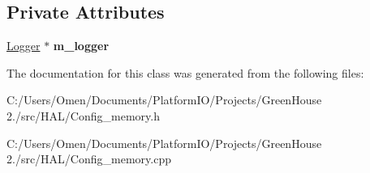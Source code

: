 \subsection*{Private Attributes}
\begin{DoxyCompactItemize}
\item 
\mbox{\label{class_h_a_l_1_1_config__memory_a884de2bfa5cf58adb8e25636eead14b9}} 
\hyperlink{class_logger}{Logger} $\ast$ {\bfseries m\+\_\+logger}
\end{DoxyCompactItemize}


The documentation for this class was generated from the following files\+:\begin{DoxyCompactItemize}
\item 
C\+:/\+Users/\+Omen/\+Documents/\+Platform\+I\+O/\+Projects/\+Green\+House 2./src/\+H\+A\+L/Config\+\_\+memory.\+h\item 
C\+:/\+Users/\+Omen/\+Documents/\+Platform\+I\+O/\+Projects/\+Green\+House 2./src/\+H\+A\+L/Config\+\_\+memory.\+cpp\end{DoxyCompactItemize}

